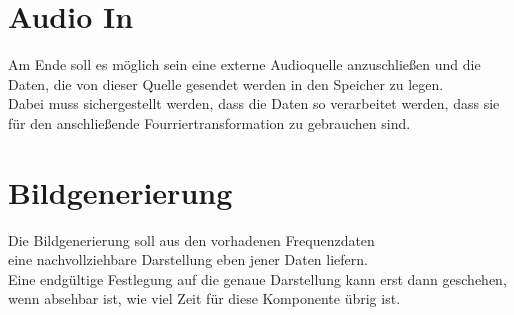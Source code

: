 \documentclass{article}
\begin{document}
\section{Audio In}
Am Ende soll es möglich sein eine externe Audioquelle anzuschließen und die 
Daten, die von dieser Quelle gesendet werden in den Speicher zu legen.\\
Dabei muss sichergestellt werden, dass die Daten so verarbeitet werden, dass sie für den anschließende Fourriertransformation zu gebrauchen sind. 

\section{Bildgenerierung}

Die Bildgenerierung soll aus den vorhadenen Frequenzdaten \\
eine nachvollziehbare Darstellung eben jener Daten liefern. \\
Eine endgültige Festlegung auf die genaue Darstellung kann erst dann geschehen, wenn absehbar ist, wie viel Zeit für diese Komponente übrig ist.
\end{document}
